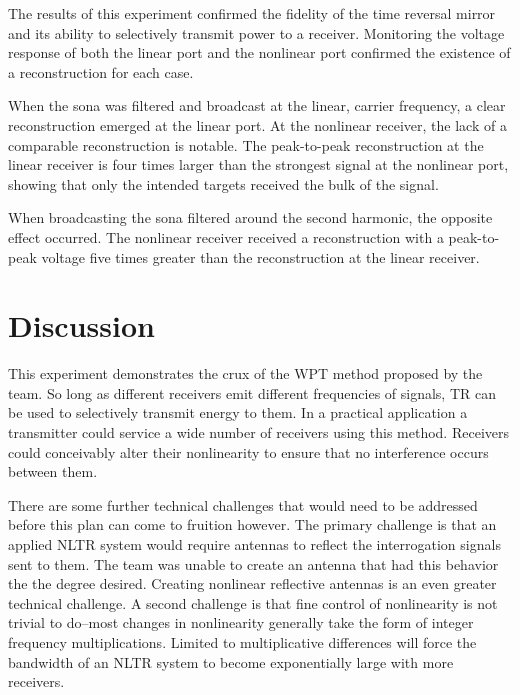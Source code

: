 The results of this experiment confirmed the fidelity of the time reversal mirror and its ability to selectively transmit power to a receiver. Monitoring the voltage response of both the linear port and the nonlinear port confirmed the existence of a reconstruction for each case.

When the sona was filtered and broadcast at the linear, carrier frequency, a clear reconstruction emerged at the linear port. At the nonlinear receiver, the lack of a comparable reconstruction is notable. The peak-to-peak reconstruction at the linear receiver is four times larger than the strongest signal at the nonlinear port, showing that only the intended targets received the bulk of the signal.

When broadcasting the sona filtered around the second harmonic, the opposite effect occurred. The nonlinear receiver received a reconstruction with a peak-to-peak voltage five times greater than the reconstruction at the linear receiver.

\section{Discussion}
\label{sec:selective-discussion}

This experiment demonstrates the crux of the WPT method proposed by the team. So long as different receivers emit different frequencies of signals, TR can be used to selectively transmit energy to them. In a practical application a transmitter could service a wide number of receivers using this method. Receivers could conceivably alter their nonlinearity to ensure that no interference occurs between them.

There are some further technical challenges that would need to be addressed before this plan can come to fruition however. The primary challenge is that an applied NLTR system would require antennas to reflect the interrogation signals sent to them. The team was unable to create an antenna that had this behavior the the degree desired. Creating nonlinear reflective antennas is an even greater technical challenge. A second challenge is that fine control of nonlinearity is not trivial to do--most changes in nonlinearity generally take the form of integer frequency multiplications. Limited to multiplicative differences will force the bandwidth of an NLTR system to become exponentially large with more receivers.
